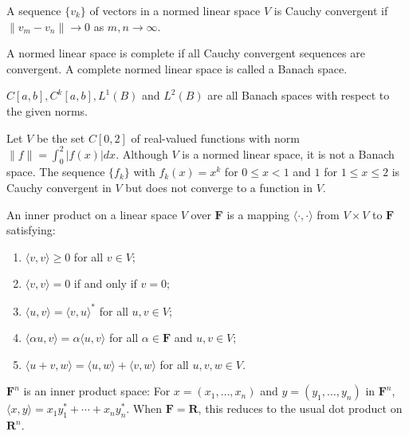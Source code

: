 \documentclass{report}
\begin{document}
    \begin{defBox}
    A sequence $\{v_k\}$ of vectors in a normed linear space $V$ is Cauchy convergent if $\|v_m - v_n\| \rightarrow 0$ as $m, n \rightarrow \infty$.
    \end{defBox}

    \begin{defBox}
    A normed linear space is complete if all Cauchy convergent sequences are convergent. A complete normed linear space is called a Banach space.
    \end{defBox}

    \begin{Example}
    $C[a, b], C^{k}[a, b], L^{1}(B)$ and $L^{2}(B)$ are all Banach spaces with respect to the given norms.
    \end{Example}

    \begin{Example}
    Let $V$ be the set $C[0,2]$ of real-valued functions with norm $\|f \| = \int_{0}^{2} |f(x)| dx$. Although $V$ is a normed linear space, it is not a Banach space. The sequence $\{f_k\}$ with $f_k(x) = x^k$ for $0 \leq x < 1$ and $1$ for $1 \leq x \leq 2$ is Cauchy convergent in $V$ but does not converge to a function in $V$.
    \end{Example}

    \begin{defBox}
    An inner product on a linear space $V$ over $\mathbf{F}$ is a mapping $\langle \cdot, \cdot \rangle$ from $V \times V$ to $\mathbf{F}$ satisfying:
    \begin{enumerate}
        \item $\langle v, v \rangle \geq 0$ for all $v \in V$;
        \item $\langle v, v \rangle = 0$ if and only if $v = 0$;
        \item $\langle u, v \rangle = \langle v, u \rangle^{*}$ for all $u, v \in V$;
        \item $\langle \alpha u, v \rangle = \alpha \langle u, v \rangle$ for all $\alpha \in \mathbf{F}$ and $u, v \in V$;
        \item $\langle u+v, w \rangle = \langle u, w \rangle + \langle v, w \rangle$ for all $u, v, w \in V$.
    \end{enumerate}
    \end{defBox}

    \begin{Example}
    $\mathbf{F}^{n}$ is an inner product space: For $x = (x_1, \ldots, x_n)$ and $y = (y_1, \ldots, y_n)$ in $\mathbf{F}^{n}$, $\langle x, y \rangle = x_1 y_1^{*} + \cdots + x_n y_n^{*}$. When $\mathbf{F} = \mathbf{R}$, this reduces to the usual dot product on $\mathbf{R}^{n}$.
    \end{Example}
\end{document}
